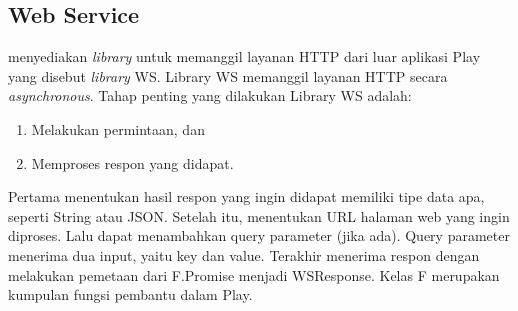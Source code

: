 %


\subsection{Web Service}
\play menyediakan \textit{library} untuk memanggil layanan HTTP dari luar aplikasi Play yang disebut \textit{library} WS. Library WS memanggil layanan HTTP secara \textit{asynchronous}. Tahap penting yang dilakukan Library WS adalah:
\begin{enumerate}
	\item Melakukan permintaan, dan
	\item Memproses respon yang didapat.
\end{enumerate}

Pertama menentukan hasil respon yang ingin didapat memiliki tipe data apa, seperti String atau JSON. Setelah itu, menentukan URL halaman web yang ingin diproses. Lalu dapat menambahkan query parameter (jika ada). Query parameter menerima dua input, yaitu key dan value. Terakhir menerima respon dengan melakukan pemetaan dari F.Promise menjadi WSResponse. Kelas F merupakan kumpulan fungsi pembantu dalam Play.

